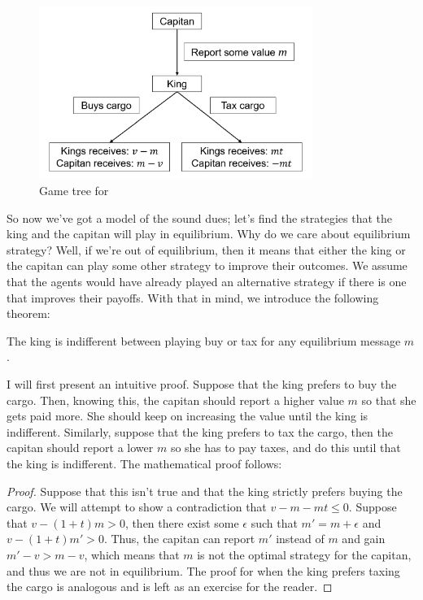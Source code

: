 \begin{figure}[H]
    \caption{Game tree for \citet{Haan_2012_Taxation}}
    \centering
    \includegraphics[width = 3.5in]{taxgamertree.png}
\end{figure}

So now we've got a model of the sound dues; let's find the strategies that the king and the capitan will play in equilibrium. Why do we care about equilibrium strategy? Well, if we're out of equilibrium, then it means that either the king or the capitan can play some other strategy to improve their outcomes. We assume that the agents would have already played an alternative strategy if there is one that improves their payoffs. With that in mind, we introduce the following theorem:

\begin{theorem}
    The king is indifferent between playing buy or tax for any equilibrium message $m$.
\end{theorem}
I will first present an intuitive proof. Suppose that the king prefers to buy the cargo. Then, knowing this, the capitan should report a higher value $m$ so that she gets paid more. She should keep on increasing the value until the king is indifferent. Similarly, suppose that the king prefers to tax the cargo, then the capitan should report a lower $m$ so she has to pay taxes, and do this until that the king is indifferent. The mathematical proof follows:
\begin{proof}
    Suppose that this isn't true and that the king strictly prefers buying the cargo. We will attempt to show a contradiction that $v - m - mt \leq 0$. Suppose that $v - (1 + t)m > 0$, then there exist some $\epsilon$ such that $m' = m + \epsilon$ and $v - (1 + t)m' > 0$. Thus, the capitan can report $m'$ instead of $m$ and gain $m'-v > m - v$, which means that $m$ is not the optimal strategy for the capitan, and thus we are not in equilibrium. The proof for when the king prefers taxing the cargo is analogous and is left as an exercise for the reader. 
\end{proof}

